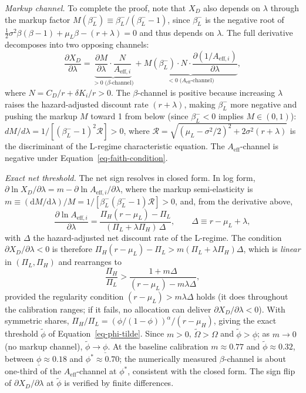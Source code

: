 \documentclass[
  11pt,
  letterpaper,
]{scrartcl}
\begin{document}
\emph{Markup channel.} To complete the proof, note that \(X_D\) also
depends on \(\lambda\) through the markup factor
\(M(\beta_L^-) \equiv \beta_L^- / (\beta_L^- - 1)\), since \(\beta_L^-\)
is the negative root of
\(\tfrac{1}{2}\sigma^2 \beta(\beta - 1) + \mu_L \beta - (r + \lambda) = 0\)
and thus depends on \(\lambda\). The full derivative decomposes into two
opposing channels: \[
\frac{\partial X_D}{\partial \lambda} = \underbrace{\frac{\partial M}{\partial \lambda} \cdot \frac{N}{A_{\text{eff},i}}}_{>0\;\text{($\beta$-channel)}} + \underbrace{M(\beta_L^-) \cdot N \cdot \frac{\partial (1/A_{\text{eff},i})}{\partial \lambda}}_{<0\;\text{($A_{\text{eff}}$-channel)}},
\] where \(N = C_D/r + \delta K_i/r > 0\). The \(\beta\)-channel is
positive because increasing \(\lambda\) raises the hazard-adjusted
discount rate \((r + \lambda)\), making \(\beta_L^-\) more negative and
pushing the markup \(M\) toward 1 from below (since \(\beta_L^- < 0\)
implies \(M \in (0,1)\)):
\(dM/d\lambda = 1/[(\beta_L^- - 1)^2 \mathcal{R}] > 0\), where
\(\mathcal{R} = \sqrt{(\mu_L - \sigma^2/2)^2 + 2\sigma^2(r+\lambda)}\)
is the discriminant of the L-regime characteristic equation. The
\(A_{\text{eff}}\)-channel is negative under
Equation~\ref{eq-faith-condition}.

\emph{Exact net threshold.} The net sign resolves in closed form. In log
form,
\(\partial \ln X_D / \partial \lambda = m - \partial \ln A_{\text{eff},i} / \partial \lambda\),
where the markup semi-elasticity is
\(m \equiv (\mathrm{d}M/\mathrm{d}\lambda)/M = 1/[\beta_L^-(\beta_L^- - 1)\mathcal{R}] > 0\),
and, from the derivative above, \[
\frac{\partial \ln A_{\text{eff},i}}{\partial \lambda} = \frac{\Pi_H(r - \mu_L) - \Pi_L}{(\Pi_L + \lambda \Pi_H)\,\Delta}, \qquad \Delta \equiv r - \mu_L + \lambda,
\] with \(\Delta\) the hazard-adjusted net discount rate of the
L-regime. The condition \(\partial X_D / \partial \lambda < 0\) is
therefore \(\Pi_H(r - \mu_L) - \Pi_L > m(\Pi_L + \lambda \Pi_H)\Delta\),
which is \emph{linear} in \((\Pi_L, \Pi_H)\) and rearranges to \[
\frac{\Pi_H}{\Pi_L} > \frac{1 + m\Delta}{(r - \mu_L) - m\lambda\Delta},
\] provided the regularity condition \((r - \mu_L) > m\lambda\Delta\)
holds (it does throughout the calibration ranges; if it fails, no
allocation can deliver \(\partial X_D/\partial\lambda < 0\)). With
symmetric shares,
\(\Pi_H/\Pi_L = (\phi/(1-\phi))^\alpha / (r - \mu_H)\), giving the exact
threshold \(\tilde{\phi}\) of Equation~\ref{eq-phi-tilde}. Since
\(m > 0\), \(\tilde{\Omega} > \Omega\) and
\(\tilde{\phi} > \underline{\phi}\); as \(m \to 0\) (no markup channel),
\(\tilde{\phi} \to \underline{\phi}\). At the baseline calibration
\(m \approx 0.77\) and \(\tilde{\phi} \approx 0.32\), between
\(\underline{\phi} \approx 0.18\) and \(\phi^* \approx 0.70\); the
numerically measured \(\beta\)-channel is about one-third of the
\(A_{\text{eff}}\)-channel at \(\phi^*\), consistent with the closed
form. The sign flip of \(\partial X_D/\partial \lambda\) at
\(\tilde{\phi}\) is verified by finite differences.
\end{document}
